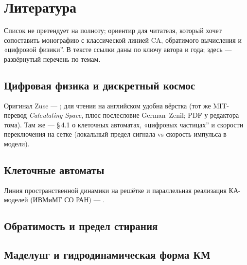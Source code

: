 \chapter{Литература}
\label{ch:literature}

Список не претендует на полноту; ориентир для читателя, который хочет сопоставить монографию с классической линией CA, обратимого вычисления и «цифровой физики''.
В тексте ссылки даны по ключу автора и года; здесь --- развёрнутый перечень по темам.

\section{Цифровая физика и дискретный космос}
\noindent
Оригинал Zuse --- \textcite{zuse1969}; для чтения на английском удобна вёрстка \textcite{zuse2012zenil}
(тот же MIT-перевод \emph{Calculating Space}, плюс послесловие German--Zenil; PDF у редактора тома).
Там же --- §\,4.1 о клеточных автоматах, «цифровых частицах'' и скорости переключения на сетке
(локальный предел сигнала vs скорость импульса в модели).
\begin{refsection}
\nocite{zuse1967,zuse1969,zuse2012zenil,fredkin1990,feynman1982,mainzer2011,tHooft2016}
\printbibliography[heading=none]
\end{refsection}

\section{Клеточные автоматы}
\noindent
Линия пространственной динамики на решётке и параллельная реализация КА-моделей
(ИВМиМГ СО РАН) --- \textcite{bandman2006,bandman2001}.
\begin{refsection}
\nocite{vonneumann1966,gardner1970,cook2004,wolfram1984,wolfram2002,vichniac1984,toffoli1987,bandman2006,bandman2001}
\printbibliography[heading=none]
\end{refsection}

\section{Обратимость и предел стирания}
\begin{refsection}
\nocite{bennett1973,landauer1961,toffoli1982}
\printbibliography[heading=none]
\end{refsection}

\section{Маделунг и гидродинамическая форма КМ}
\begin{refsection}
\nocite{madelung1927}
\printbibliography[heading=none]
\end{refsection}
